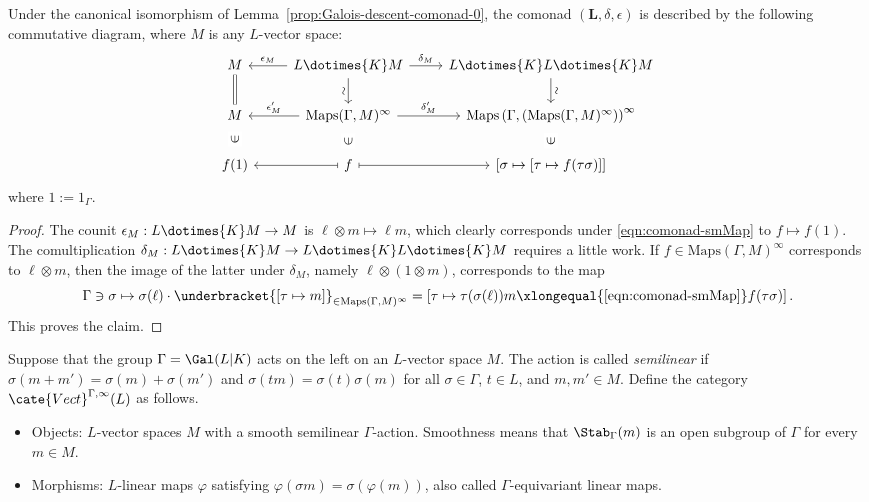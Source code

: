 \begin{lemma}\label{prop:Galois-descent-comonad-1}
	Under the canonical isomorphism of
	Lemma~\ref{prop:Galois-descent-comonad-0}, the comonad
	$(\mathbf{L},\delta,\epsilon)$ is described by the following commutative
	diagram, where $M$ is any $L$-vector space:
	\[\begin{tikzcd}
		M \arrow[equal, d] & L \dotimes{K} M \arrow[r, "{\delta_M}"] \arrow[d, "\sim"', sloped] \arrow[l, "{\epsilon_M}"'] & L \dotimes{K} L \dotimes{K} M \arrow[d, "\sim", sloped] \\
		M & \mathrm{Maps}(\Gamma, M)^\infty \arrow[r, "{\delta'_M}"] \arrow[l, "{\epsilon'_M}"'] & \mathrm{Maps}\left(\Gamma, (\mathrm{Maps}(\Gamma, M)^\infty )\right)^\infty \\
		f(1) \arrow[phantom, u, "\in" description, sloped] & f \arrow[mapsto, r] \arrow[phantom, u, "\in" description, sloped] \arrow[mapsto, l] & {[\sigma \mapsto [\tau \mapsto f(\tau\sigma) ]]} \arrow[phantom, u, "\in" description, sloped]
	\end{tikzcd}\]
	where $1:=1_\Gamma$.
\end{lemma}
\begin{proof}
	The counit $\epsilon_M:L\dotimes{K}M\to M$ is
	$\ell\otimes m\mapsto\ell m$, which clearly corresponds under
	\eqref{eqn:comonad-smMap} to $f\mapsto f(1)$. The comultiplication
	$\delta_M:L\dotimes{K}M\to L\dotimes{K}L\dotimes{K}M$ requires a little
	work. If $f\in\mathrm{Maps}(\Gamma,M)^\infty$ corresponds to
	$\ell\otimes m$, then the image of the latter under $\delta_M$, namely
	$\ell\otimes(1\otimes m)$, corresponds to the map
	\[ \Gamma \ni \sigma \mapsto \sigma(\ell)  \cdot \underbracket{\left[ \tau \mapsto m  \right]}_{\in \mathrm{Maps}(\Gamma, M)^\infty} = \left[ \tau \mapsto \tau(\sigma(\ell))m \xlongequal{\text{\eqref{eqn:comonad-smMap}}} f(\tau\sigma) \right]. \]
	This proves the claim.
\end{proof}

\begin{definition}\label{def:semilinear-action}
	Suppose that the group $\Gamma=\Gal(L|K)$ acts on the left on an
	$L$-vector space $M$. The action is called \emph{semilinear} if
	$\sigma(m+m')=\sigma(m)+\sigma(m')$ and
	$\sigma(tm)=\sigma(t)\sigma(m)$ for all $\sigma\in\Gamma$, $t\in L$, and
	$m,m'\in M$. Define the category $\cate{Vect}^{\Gamma,\infty}(L)$ as
	follows.
	\begin{itemize}
		\item Objects: $L$-vector spaces $M$ with a smooth semilinear
		$\Gamma$-action. Smoothness means that $\Stab_\Gamma(m)$ is an open
		subgroup of $\Gamma$ for every $m\in M$.
		\item Morphisms: $L$-linear maps $\varphi$ satisfying
		$\varphi(\sigma m)=\sigma(\varphi(m))$, also called
		$\Gamma$-equivariant linear maps.
	\end{itemize}
\end{definition}

